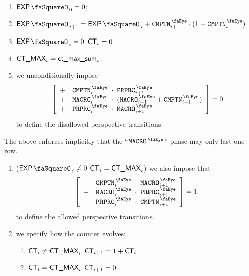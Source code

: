 \begin{enumerate}
	\item $\expStamp_{0} = 0$;
	\item $\expStamp_{i + 1} = \expStamp_{i} + \isComputation_{i + 1} \cdot (1 - \isComputation_{i})$
	\item \If $\expStamp_{i} = 0$ \Then $\textsf{CT}_{i} = 0$
	\item $\textsf{CT\_MAX}_{i} = \textsf{ct\_max\_sum}_{i}$.
	\item we unconditionally impose
	      \[
		      \left[ \begin{array}{lrcl}
				      + & \isComputation_{i}   & \!\!\! \cdot \!\!\! & \isPreprocessing_{i + 1}                      \\
				      + & \isMacro_{i}         & \!\!\! \cdot \!\!\! & (\isMacro_{i + 1} + \isComputation  _{i + 1}) \\
				      + & \isPreprocessing_{i} & \!\!\! \cdot \!\!\! & \isMacro        _{i + 1}                      \\
			      \end{array} \right]
		      = 0
	      \]
	      to define the disallowed perspective transitions.
\end{enumerate}
\saNote{} The above enforces implicitly that the ``$\isMacro$'' phase may only last one row.
\begin{enumerate}[resume]
	\item \If \Big($\expStamp_{i} \neq 0$ \et $\textsf{CT}_{i} = \textsf{CT\_MAX}_{i}$\Big) \Then we also impose that
	      \[
		      \left[ \begin{array}{lrcl}
				      + & \isComputation_{i}   & \!\!\! \cdot \!\!\! & \isMacro          _{i + 1} \\
				      + & \isMacro_{i}         & \!\!\! \cdot \!\!\! & \isPreprocessing  _{i + 1} \\
				      + & \isPreprocessing_{i} & \!\!\! \cdot \!\!\! & \isComputation    _{i + 1} \\
			      \end{array} \right]
		      = 1.
	      \]
	      to define the allowed perspective transitions.
	\item we specify how the counter evolves:
	      \begin{enumerate}
		      \item \If $\textsf{CT}_{i} \neq \textsf{CT\_MAX}_{i}$ \Then $\textsf{CT}_{i + 1} = 1 + \textsf{CT}_{i}$
		      \item \If $\textsf{CT}_{i} =    \textsf{CT\_MAX}_{i}$ \Then $\textsf{CT}_{i + 1} = 0$
	      \end{enumerate}
\end{enumerate}
